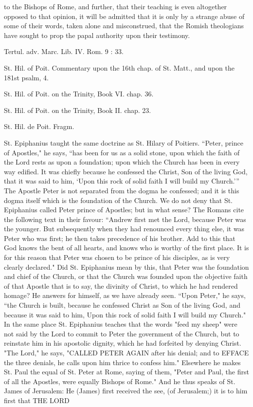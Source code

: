 to the Bishops of Rome, and further, that their teaching is even altogether opposed to that opinion, it will be admitted that it is only by a strange abuse of some of their words, taken alone and misconstrued, that the Romish theologians have sought to prop the papal authority upon their testimony.

Tertul. adv. Marc. Lib. IV. Rom. 9 : 33.

St. Hil. of Poit. Commentary upon the 16th chap. of St. Matt., and upon the 181st psalm, 4.

St. Hil. of Poit. on the Trinity, Book VI. chap. 36.

St. Hil. of Poit. on the Trinity, Book II. chap. 23.

St. Hil. de Poit. Fragm.

St. Epiphanius taught the same doctrine as St. Hilary of Poitiers. “Peter, prince of Apostles," he says, “has been for us as a solid stone, upon which the faith of the Lord rests as upon a foundation; upon which the Church has been in every way edified. It was chiefly because he confessed the Christ, Son of the living God, that it was said to him, ‘Upon this rock of solid faith I will build my Church.’” The Apostle Peter is not separated from the dogma he confessed; and it is this dogma itself which is the foundation of the Church. We do not deny that St. Epiphanius called Peter prince of Apostles; but in what sense? The Romans cite the following text in their favour: “Andrew first met the Lord, because Peter was the younger. But subsequently when they had renounced every thing else, it was Peter who was first; he then takes precedence of his brother. Add to this that God knows the bent of all hearts, and knows who is worthy of the first place. It is for this reason that Peter was chosen to be prince of his disciples, as is very clearly declared." Did St. Epiphanius mean by this, that Peter was the foundation and chief of the Church, or that the Church was founded upon the objective faith of that Apostle that is to say, the divinity of Christ, to which he had rendered homage? He answers for himself, as we have already seen. “Upon Peter," he says, “the Church is built, because he confessed Christ as Son of the living God, and because it was said to him, Upon this rock of solid faith I will build my Church." In the same place St. Epiphanius teaches that the words "feed my sheep" were not said by the Lord to commit to Peter the government of the Church, but to reinstate him in his apostolic dignity, which he had forfeited by denying Christ. "The Lord," he says, "CALLED PETER AGAIN after his denial; and to EFFACE the three denials, he calls upon him thrice to confess him." Elsewhere he makes St. Paul the equal of St. Peter at Rome, saying of them, "Peter and Paul, the first of all the Apostles, were equally Bishops of Rome." And he thus speaks of St. James of Jerusalem: He (James) first received the see, (of Jerusalem;) it is to him first that THE LORD

